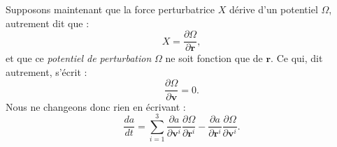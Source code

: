\documentclass[12pt,paperletter, reqno]{amsart}
\newcommand{\rr}{\mathbf{r}}
\newcommand{\vv}{\mathbf{v}}
\theoremstyle{plain}
\theoremstyle{remark}
\begin{document}
  Supposons maintenant que la force perturbatrice $X$ dérive d'un potentiel $\Omega$,
  autrement dit que :
  \begin{equation}
    X = \frac{\partial \Omega}{\partial \rr},
  \end{equation}
  et que ce \emph{potentiel de perturbation} $\Omega$ ne soit fonction que de $\rr$.
  Ce qui,
  dit autrement,
  s'écrit :
  \begin{equation}
    \frac{\partial \Omega}{\partial \vv} =0.
  \end{equation}
  Nous ne changeons donc rien en écrivant :
  \begin{equation}\label{eq_A}
    \frac{da}{dt} = \sum_{i=1}^3\frac{\partial a}{\partial \vv^i}\frac{\partial \Omega}{\partial \rr^i} -  \frac{\partial a}{\partial \rr^i}\frac{\partial \Omega}{\partial \vv^i}.
  \end{equation}
  
\end{document}
